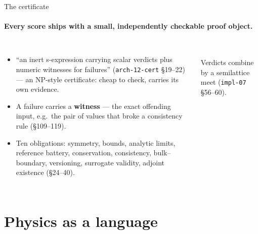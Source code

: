 \documentclass[aspectratio=169,10pt]{beamer}
\newcommand{\code}[1]{\texttt{#1}}
\newcommand{\cz}[1]{({\scriptsize\color{gray}#1})}     %
\begin{document}
\begin{frame}{The certificate}
  \framesubtitle{Every score ships with a small, independently checkable proof object.}
  \begin{columns}[T]
    \begin{itemize}\small
      \item ``an inert s-expression carrying scalar verdicts plus numeric witnesses for
        failures'' \cz{\code{arch-12-cert} \S19--22} --- an NP-style certificate: cheap to check,
        carries its own evidence.
      \item A failure carries a \textbf{witness} --- the exact offending input, e.g.\ the pair of
        values that broke a consistency rule \cz{\S109--119}.
      \item Ten obligations: symmetry, bounds, analytic limits, reference battery, conservation,
        consistency, bulk--boundary, versioning, surrogate validity, adjoint existence
        \cz{\S24--40}.
    \end{itemize}
    \begin{center}
    \\[0.4em]
    {\scriptsize Verdicts combine by a semilattice meet \cz{\code{impl-07} \S56--60}.}
    \end{center}
  \end{columns}
\end{frame}

\section{Physics as a language}
\end{document}
